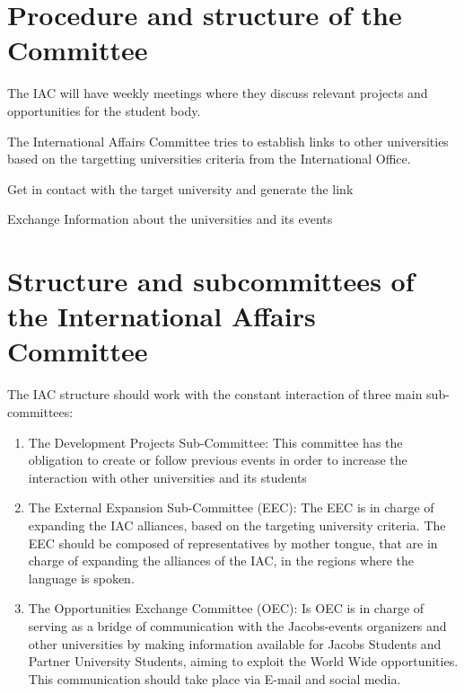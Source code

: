 {\protect\section{Procedure and structure of the Committee}
The IAC will have weekly meetings where they discuss relevant projects and opportunities for the student body.
\protect\begin{parenum}
	\item The International Affairs Committee tries to establish links to other universities based on the targetting universities criteria from the International Office.
	\item Get in contact with the target university and generate the link
	\item  Exchange Information about the universities and its events
 \end{parenum}

\protect\section{Structure and subcommittees of the International Affairs Committee}
	The IAC structure should work with the constant interaction of three main sub-committees:
	\protect\begin{enumerate}
		\item The Development Projects Sub-Committee:
		This committee has the obligation to create or follow previous events in order to increase the
		interaction with other universities and its students
		\item The External Expansion Sub-Committee (EEC):
		The EEC is in charge of expanding the IAC alliances, based on the targeting university criteria.
		The EEC should be composed of representatives by mother tongue, that are in charge of expanding the alliances of the IAC, in the regions where the language is spoken.
		\item The Opportunities Exchange Committee (OEC):
		Is OEC is in charge of serving as a bridge of communication with the Jacobs-events organizers and other universities by making information available for Jacobs Students and Partner University Students, aiming to exploit the World Wide opportunities.
		This communication should take place via E-mail and social media.
	\end{enumerate}

}
